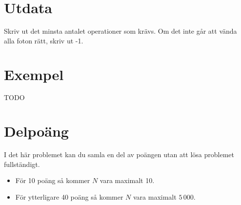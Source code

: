 \section*{Utdata}
Skriv ut det minsta antalet operationer som krävs. Om det inte går att vända
alla foton rätt, skriv ut -1.

\section*{Exempel} TODO

\section*{Delpoäng} I det här problemet kan du samla en del av poängen utan att
lösa problemet fullständigt.

\begin{itemize}
    \item För 10 poäng så kommer $N$ vara maximalt 10.
    \item För ytterligare 40 poäng så kommer $N$ vara maximalt $5\,000$.
\end{itemize}
